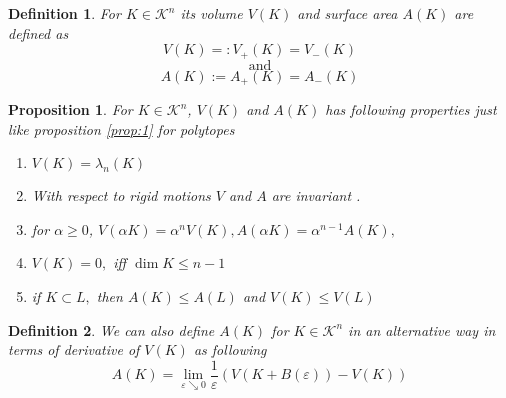 \documentclass[oneside]{book}
\newtheorem{mydef}{Definition}
\newtheorem{prop}{Proposition}
\begin{document}
 \begin{mydef}
 For $K \in \mathcal{K}^n$ its volume $V(K) $ and surface area $A(K)$ are defined as 
\[
  V(K) =: V_{+}(K)=V_{-}(K)
\]
$$\text{and} $$
\[
 A(K) :=  A_{+}(K) = A_{-}(K) 
\]
 
\end{mydef}
 \begin{prop}
 
For $ K \in \mathcal{K}^n $,  $V(K) $ and $A(K) $ has following properties just like proposition \ref{prop:1} for polytopes
\begin{enumerate}
    \item  $V(K)=\lambda_{n}(K)$
\item With respect to rigid motions $V$ and $A$ are invariant .
\item  for $\alpha \geq 0$, $V(\alpha K)=\alpha^{n} V(K), A(\alpha K)=\alpha^{n-1} A(K),$ 
\item $V(K)=0,$ iff $\operatorname{dim} K \leq n-1$
\item if $K \subset L,$ then  $A(K) \leq A(L)$ and $V(K) \leq V(L)$
\end{enumerate}
 \end{prop}
\begin{mydef}
We can also define $A(K)$ for $K \in \mathcal{K}^n$ in an alternative way in terms of derivative of $V(K)$ as following \\
\begin{equation}
\label{eq48}
A(K)=\lim _{\varepsilon \searrow 0} \frac{1}{\varepsilon}(V(K+B(\varepsilon))-V(K))
\end{equation}
\end{mydef}
\newpage
\end{document}
